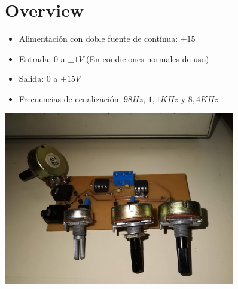 \documentclass[a4paper,12pt,oneside,pdflatex,italian,final,twocolumn]{article}
\begin{document}
\begin{figure}
  \begin{minipage}{0.6\textwidth}

    \section{Overview}
    \begin{itemize}
      \item Alimentación con doble fuente de contínua: $\pm 15$
      \item Entrada: $0$ a $\pm 1V$ (En condiciones normales de uso)
      \item Salida: $0$ a $\pm 15V$
      \item Frecuencias de ecualización: $98 Hz$, $1,1 KHz$ y $8,4 KHz$
    \end{itemize}


  \end{minipage}
  \hfill
  \begin{minipage}{0.4\textwidth}
    \centering
    \includegraphics[width=0.9\textwidth,right]{EQ_picture}

  \end{minipage}
\end{figure}
\end{document}
